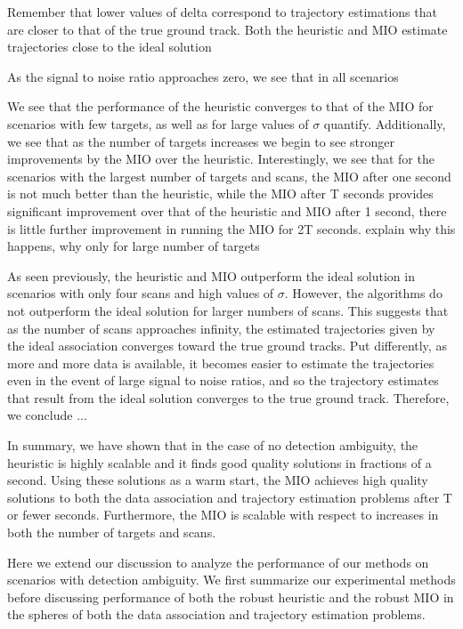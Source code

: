 Remember that lower values of delta correspond to trajectory estimations that are closer to that of the true ground track. Both the heuristic and MIO estimate trajectories close to the ideal solution 

As the signal to noise ratio approaches zero, we see that in all scenarios


We see that the performance of the heuristic converges to that of the MIO for scenarios with few targets, as well as for large values of $\sigma$ {\color{red} quantify}. Additionally, we see that as the number of targets increases we begin to see stronger improvements by the MIO over the heuristic. Interestingly, we see that for the scenarios with the largest number of targets and scans, the MIO after one second is not much better than the heuristic, while the MIO after T seconds provides significant improvement over that of the heuristic and MIO after 1 second, there is little further improvement in running the MIO for 2T seconds. {\color{red} explain why this happens, why only for large number of targets} 

As seen previously, the heuristic and MIO outperform the ideal solution in scenarios with only four scans and high values of $\sigma$. However, the algorithms do not outperform the ideal solution for larger numbers of scans. This suggests that as the number of scans approaches infinity, the estimated trajectories given by the ideal association converges toward the true ground tracks. Put differently, as more and more data is available, it becomes easier to estimate the trajectories even in the event of large signal to noise ratios, and so the trajectory estimates that result from the ideal solution converges to the true ground track. Therefore, we conclude ...

In summary, we have shown that in the case of no detection ambiguity, the heuristic is highly scalable and it finds good quality solutions in fractions of a second. Using these solutions as a warm start, the MIO achieves high quality solutions to both the data association and trajectory estimation problems after T or fewer seconds. Furthermore, the MIO is scalable with respect to increases in both the number of targets and scans.

Here we extend our discussion to analyze the performance of our methods on scenarios with detection ambiguity. We first summarize our experimental methods before discussing performance of both the robust heuristic and the robust MIO in the spheres of both the data association and trajectory estimation problems.

